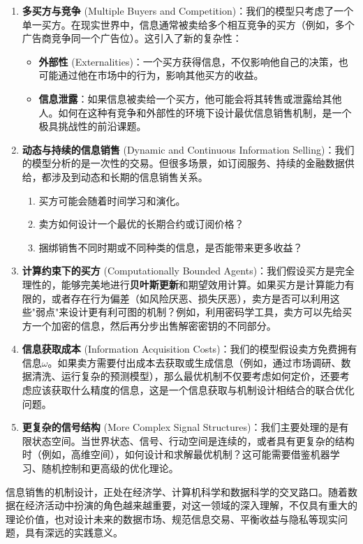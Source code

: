 \begin{enumerate}
    \item \textbf{多买方与竞争} (Multiple Buyers and Competition)：我们的模型只考虑了一个单一买方。在现实世界中，信息通常被卖给多个相互竞争的买方（例如，多个广告商竞争同一个广告位）。这引入了新的复杂性：
       \begin{itemize}
         \item \textbf{外部性} (Externalities)：一个买方获得信息，不仅影响他自己的决策，也可能通过他在市场中的行为，影响其他买方的收益。
         \item \textbf{信息泄露}：如果信息被卖给一个买方，他可能会将其转售或泄露给其他人。如何在这种有竞争和外部性的环境下设计最优信息销售机制，是一个极具挑战性的前沿课题。
       \end{itemize}
    \item \textbf{动态与持续的信息销售} (Dynamic and Continuous Information Selling)：我们的模型分析的是一次性的交易。但很多场景，如订阅服务、持续的金融数据供给，都涉及到动态和长期的信息销售关系。
       \begin{enumerate}
         \item 买方可能会随着时间学习和演化。
         \item 卖方如何设计一个最优的长期合约或订阅价格？
         \item 捆绑销售不同时期或不同种类的信息，是否能带来更多收益？
       \end{enumerate}
    \item \textbf{计算约束下的买方} (Computationally Bounded Agents)：我们假设买方是完全理性的，能够完美地进行\textbf{贝叶斯更新}和期望效用计算。如果买方是计算能力有限的，或者存在行为偏差（如风险厌恶、损失厌恶），卖方是否可以利用这些"弱点"来设计更有利可图的机制？例如，利用密码学工具，卖方可以先给买方一个加密的信息，然后再分步出售解密密钥的不同部分。
    \item \textbf{信息获取成本} (Information Acquisition Costs)：我们的模型假设卖方免费拥有信息$\omega$。如果卖方需要付出成本去获取或生成信息（例如，通过市场调研、数据清洗、运行复杂的预测模型），那么最优机制不仅要考虑如何定价，还要考虑应该获取什么精度的信息，这是一个信息获取与机制设计相结合的联合优化问题。
    \item \textbf{更复杂的信号结构} (More Complex Signal Structures)：我们主要处理的是有限状态空间。当世界状态、信号、行动空间是连续的，或者具有更复杂的结构时（例如，高维空间），如何设计和求解最优机制？这可能需要借鉴机器学习、随机控制和更高级的优化理论。
\end{enumerate}

信息销售的机制设计，正处在经济学、计算机科学和数据科学的交叉路口。随着数据在经济活动中扮演的角色越来越重要，对这一领域的深入理解，不仅具有重大的理论价值，也对设计未来的数据市场、规范信息交易、平衡收益与隐私等现实问题，具有深远的实践意义。